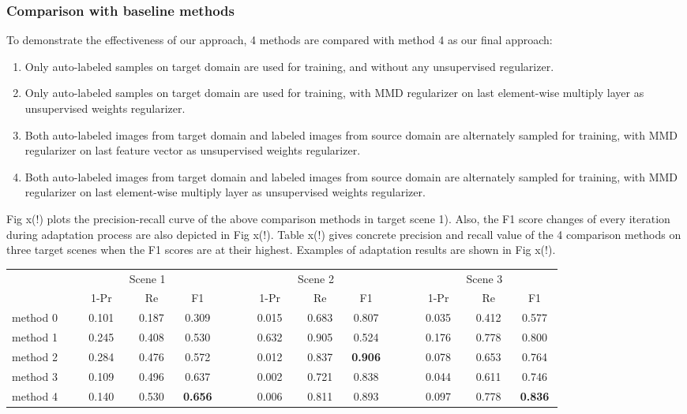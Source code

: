 \documentclass[runningheads]{llncs}
\begin{document}
\subsubsection{Comparison with baseline methods}
To demonstrate the effectiveness of our approach, 4 methods are compared with method 4 as our final approach:
\begin{enumerate}
\item Only auto-labeled samples on target domain are used for training, and without any unsupervised regularizer.
\item Only auto-labeled samples on target domain are used for training, with MMD regularizer on last element-wise multiply layer as unsupervised weights regularizer.
\item Both auto-labeled images from target domain and labeled images from source domain are alternately sampled for training, with MMD regularizer on last feature vector as unsupervised weights regularizer.
\item Both auto-labeled images from target domain and labeled images from source domain are alternately sampled for training, with MMD regularizer on last element-wise multiply layer as unsupervised weights regularizer.
\end{enumerate}
Fig x(!) plots the precision-recall curve of the above comparison methods in target scene 1). Also, the F1 score changes of every iteration during adaptation process are also depicted in Fig x(!). Table x(!) gives concrete precision and recall value of the 4 comparison methods on three target scenes when the F1 scores are at their highest. Examples of adaptation results are shown in Fig x(!).

\begin{table}
\centering
\begin{tabular}{l  c c c  c  c c c  c  c c c}
  \hline
    &   \multicolumn{3}{c}{Scene 1}   & & \multicolumn{3}{c}{Scene 2} & &  \multicolumn{3}{c}{Scene 3}   \\
   \cline{2-4} \cline{6-8} \cline{10-12}
    & ~~1-Pr~~ & ~~Re~~ & ~~F1~~ & & ~~1-Pr~~ & ~~Re~~ & ~~F1~~ & & ~~1-Pr~~ & ~~Re~~ & ~~F1~~\\
  \hline
  method 0~~ & 0.101 & 0.187 & 0.309 & ~~ & 0.015 & 0.683 & 0.807 & ~~ & 0.035 & 0.412 & 0.577 \\
  method 1~~ & 0.245 & 0.408 & 0.530 & ~~ & 0.632 & 0.905 & 0.524 & ~~ & 0.176 & 0.778 & 0.800 \\
  method 2~~ & 0.284 & 0.476 & 0.572 & ~~ & 0.012 & 0.837 & {\bf 0.906} & ~~ & 0.078 & 0.653 & 0.764 \\
  method 3~~ & 0.109 & 0.496 & 0.637 & ~~ & 0.002 & 0.721 & 0.838 & ~~ & 0.044 & 0.611 & 0.746 \\
  method 4~~ & 0.140 & 0.530 & {\bf 0.656} & ~~ & 0.006 & 0.811 & 0.893 & ~~ & 0.097 & 0.778 & {\bf 0.836} \\
  \hline
\end{tabular}
\end{table}
\end{document}
